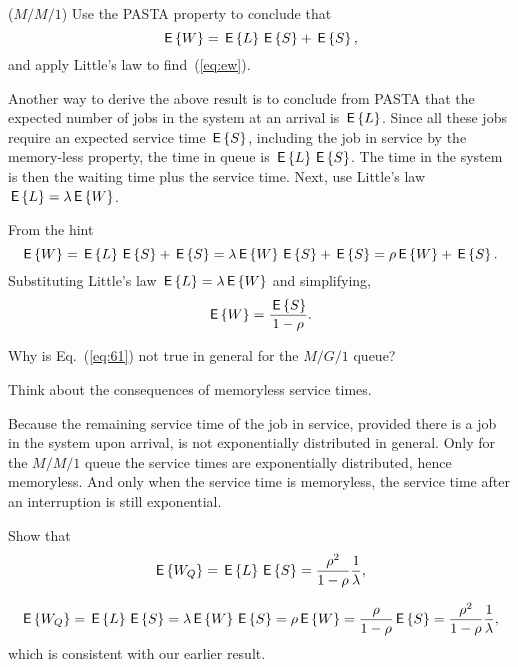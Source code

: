 \begin{exercise}($M/M/1$) Use the PASTA property to conclude that
\begin{equation}\label{eq:61}
  \,\mathsf{E}\left\{W\right\} = \,\mathsf{E}\left\{L\right\}  \,\mathsf{E}\left\{S\right\} + \,\mathsf{E}\left\{S\right\},
\end{equation}
and apply Little's law to find~(\ref{eq:ew}). 
\begin{hint}
Another way to derive the above result is to conclude from PASTA that
the expected number of jobs in the system at an arrival is $\,\mathsf{E}\left\{L\right\}$.
Since all these jobs require an expected service time $\,\mathsf{E}\left\{S\right\}$,
including the job in service by the memory-less property, the time in
queue is $\,\mathsf{E}\left\{L\right\} \,\mathsf{E}\left\{S\right\}$. The time in the system is then the waiting time
plus the service time. Next, use Little's law $\,\mathsf{E}\left\{L\right\} = \lambda \,\mathsf{E}\left\{W\right\}$.
\end{hint}
\begin{solution}
From the hint
\begin{equation}
  \,\mathsf{E}\left\{W\right\} = \,\mathsf{E}\left\{L\right\}  \,\mathsf{E}\left\{S\right\} + \,\mathsf{E}\left\{S\right\} = \lambda \,\mathsf{E}\left\{W\right\} \,\mathsf{E}\left\{S\right\} + \,\mathsf{E}\left\{S\right\} = \rho \,\mathsf{E}\left\{W\right\}  + \,\mathsf{E}\left\{S\right\}.
\end{equation}
Substituting Little's law $\,\mathsf{E}\left\{L\right\} = \lambda \,\mathsf{E}\left\{W\right\}$ and simplifying,
\begin{equation*}
\,\mathsf{E}\left\{W\right\} = \frac{\,\mathsf{E}\left\{S\right\}}{1-\rho}.
\end{equation*}
\end{solution}
\end{exercise}


\begin{exercise}
  Why is Eq.~(\ref{eq:61}) not true in general for the $M/G/1$ queue?
  \begin{hint}
Think about the consequences of memoryless service times.
  \end{hint}
  \begin{solution}
    Because the remaining service time of the job in service, provided
    there is a job in the system upon arrival, is not exponentially
    distributed in general. Only for the $M/M/1$ queue the service
    times are exponentially distributed, hence memoryless. And only
    when the service time is memoryless, the service time after an
    interruption is still exponential.
  \end{solution}
\end{exercise}

\begin{exercise}
Show that 
\begin{equation}\label{eq:wqes}
  \,\mathsf{E}\left\{W_Q\right\} = \,\mathsf{E}\left\{L\right\} \,\mathsf{E}\left\{S\right\} = \frac{\rho^2}{1-\rho} \frac 1 \lambda,
\end{equation}
  \begin{solution}
\begin{equation}
  \,\mathsf{E}\left\{W_Q\right\} = \,\mathsf{E}\left\{L\right\} \,\mathsf{E}\left\{S\right\} = \lambda \,\mathsf{E}\left\{W\right\} \,\mathsf{E}\left\{S\right\}= \rho \,\mathsf{E}\left\{W\right\} = \frac{\rho}{1-\rho} \,\mathsf{E}\left\{S\right\} = \frac{\rho^2}{1-\rho} \frac 1 \lambda,
\end{equation}
which is consistent with our earlier result.  
  \end{solution}
\end{exercise}

